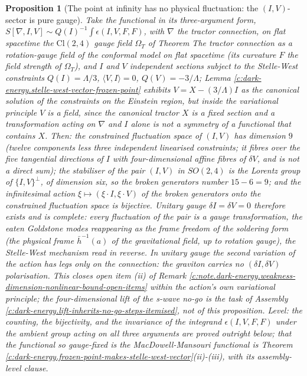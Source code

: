 \documentclass[11pt]{article}
\newtheorem{proposition}[theorem]{Proposition}
\theoremstyle{definition}
\theoremstyle{plain}
\newcommand{\changedmark}[2]{\marginpar{\raggedright\scriptsize\color{#1}#2}}
\providecommand{\Cl}{}\renewcommand{\Cl}{\mathrm{Cl}}
\providecommand{\hb}{}\renewcommand{\hb}{\bar{h}}
\providecommand{\ip}{}\renewcommand{\ip}[2]{\langle #1, #2\rangle}
\begin{document}
\begin{proposition}[The point at infinity has no physical fluctuation: the $(I,V)$-sector is pure gauge]\label{c:dark-energy.point-infinity-has-no-physical-fluctuation}
\changedmark{gray}{reworded}
Take the functional in its three-argument form, $S[\nabla, I, V] \sim Q(I)^{-1}\int\epsilon(I, V, F, F)$, with $\nabla$ the tractor connection, on flat spacetime the $\Cl(2,4)$ gauge field $\Omega_{T}$ of Theorem \emph{The tractor connection as a rotation-gauge field of the conformal model on flat spacetime} (its curvature $F$ the field strength of $\Omega_{T}$), and $I$ and $V$ independent sections subject to the Stelle-West constraints $Q(I) = \Lambda/3$, $\ip{V}{I} = 0$, $Q(V) = -3/\Lambda$; Lemma \ref{c:dark-energy.stelle-west-vector-frozen-point} exhibits $V = X - (3/\Lambda)I$ as the canonical solution of the constraints on the Einstein region, but inside the variational principle $V$ is a field, since the canonical tractor $X$ is a fixed section and a transformation acting on $\nabla$ and $I$ alone is not a symmetry of a functional that contains $X$. Then: the constrained fluctuation space of $(I, V)$ has dimension $9$ (twelve components less three independent linearised constraints; it fibres over the five tangential directions of $I$ with four-dimensional affine fibres of $\delta V$, and is not a direct sum); the stabiliser of the pair $(I, V)$ in $SO(2,4)$ is the Lorentz group of $\{I,V\}^\perp$, of dimension six, so the broken generators number $15 - 6 = 9$; and the infinitesimal action $\xi \mapsto (\xi\cdot I, \xi\cdot V)$ of the broken generators onto the constrained fluctuation space is bijective. Unitary gauge $\delta I = \delta V = 0$ therefore exists and is complete: every fluctuation of the pair is a gauge transformation, the eaten Goldstone modes reappearing as the frame freedom of the soldering form (the physical frame $\hb^{-1}(a)$ of the gravitational field, up to rotation gauge), the Stelle-West mechanism read in reverse. In unitary gauge the second variation of the action has legs only on the connection: the graviton carries no $(\delta I, \delta V)$ polarisation. This closes open item (ii) of Remark \ref{c:note.dark-energy.weakness-dimension-nonlinear-bound-open-items} within the action's own variational principle; the four-dimensional lift of the s-wave no-go is the task of Assembly \ref{c:dark-energy.lift-inherits-no-go-steps-itemised}, not of this proposition. \emph{Level:} the counting, the bijectivity, and the invariance of the integrand $\epsilon(I,V,F,F)$ under the ambient group acting on all three arguments are proved outright below; that the functional so gauge-fixed is the MacDowell-Mansouri functional is Theorem \ref{c:dark-energy.frozen-point-makes-stelle-west-vector}(ii)-(iii), with its assembly-level clause.
\end{proposition}
\end{document}
